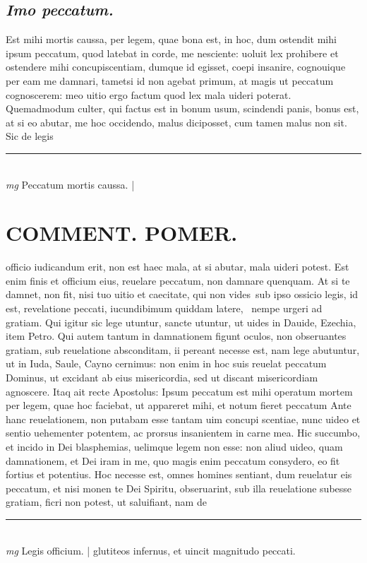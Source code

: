 \documentclass{article}
\begin{document}
\begin{pages}
\subsection*{\textit{Imo peccatum. }}\pstart Est mihi mortis caussa, per legem, quae bona est, in hoc, dum ostendit mihi ipsum peccatum, quod latebat in corde, me nesciente: uoluit lex prohibere et ostendere mihi concupiscentiam, dumque id egisset, coepi insanire, cognouique per eam me damnari, tametsi id non agebat primum, at magis ut peccatum cognoscerem: meo uitio ergo factum quod lex mala uideri poterat. Quemadmodum culter, qui factus est in bonum usum, scindendi panis, bonus est, at si eo abutar, me hoc occidendo, malus diciposset, cum tamen malus non sit. Sic de legis  \pend
\vspace{0.5cm}\noindent
\vspace{0.2cm}\rule{1cm}{0.2pt}\\ 
\hspace{0.2cm}\textit{mg}
\footnotesize Peccatum mortis caussa.  
\normalsize| 
\section*{COMMENT. POMER.  }\pstart officio iudicandum erit, non est haec mala, at si abutar, mala uideri potest. Est enim finis et officium eius, reuelare peccatum, non damnare quenquam.  At si te damnet, non fit, nisi tuo uitio et caecitate, qui non vides sub ipso ossicio legis, id est, revelatione peccati, iucundibimum quiddam latere,  nempe urgeri ad gratiam. Qui igitur sic lege utuntur, sancte utuntur, ut uides in Dauide, Ezechia, item Petro.  Qui autem tantum in damnationem figunt oculos, non obseruantes gratiam, sub reuelatione absconditam, ii pereant necesse est, nam lege abutuntur, ut in Iuda, Saule, Cayno cernimus: non enim in hoc suis reuelat peccatum Dominus, ut excidant ab eius misericordia, sed ut discant misericordiam agnoscere.  Itaq ait recte Apostolus: Ipsum peccatum est mihi operatum mortem per legem, quae hoc faciebat, ut appareret mihi, et notum fieret peccatum Ante hanc reuelationem, non putabam esse tantam uim concupi scentiae, nunc uideo et sentio uehementer potentem, ac prorsus insanientem in carne mea. Hic succumbo, et incido in Dei blasphemias, uelimque legem non esse: non aliud uideo, quam damnationem, et Dei iram in me, quo magis enim peccatum consydero, eo fit fortius et potentius. Hoc necesse est, omnes homines sentiant, dum reuelatur eis peccatum, et nisi monen te Dei Spiritu, obseruarint, sub illa reuelatione subesse gratiam, ficri non potest, ut saluifiant, nam de  \pend
\vspace{0.5cm}\noindent
\vspace{0.2cm}\rule{1cm}{0.2pt}\\ 
\hspace{0.2cm}\textit{mg}
\footnotesize Legis officium.  
\normalsize| 
\marginpar{[ p.K5 ]}
\marginpar{[ p.]}\pstart glutiteos infernus, et uincit magnitudo peccati.   \pend
{}
{}

\end{pages}
\end{document}
